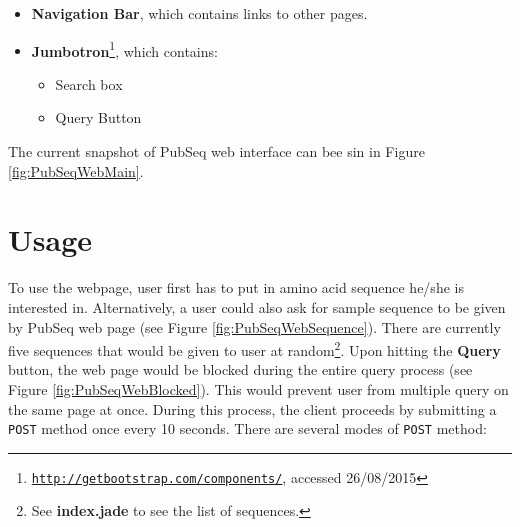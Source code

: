 \begin{itemize}
  \item \textbf{Navigation Bar}, which contains links to other pages.
  \item \textbf{Jumbotron}\footnote{\href{http://getbootstrap.com/components/}{\texttt{http://getbootstrap.com/components/}}, accessed 26/08/2015}, which contains:
  \begin{itemize}
    \item Search box
    \item Query Button
  \end{itemize}
\end{itemize}

The current snapshot of PubSeq web interface can bee sin in Figure \ref{fig:PubSeqWebMain}.

\section{Usage}

To use the webpage, user first has to put in amino acid sequence he/she is interested in. Alternatively, a user could also ask for sample sequence to be given by PubSeq web page (see Figure \ref{fig:PubSeqWebSequence}). There are currently five sequences that would be given to user at random\footnote{See \textbf{index.jade} to see the list of sequences.}. Upon hitting the \textbf{Query} button, the web page would be blocked during the entire query process (see Figure \ref{fig:PubSeqWebBlocked}). This would prevent user from multiple query on the same page at once. During this process, the client proceeds by submitting a \texttt{POST} method once every 10 seconds. There are several modes of \texttt{POST} method:

